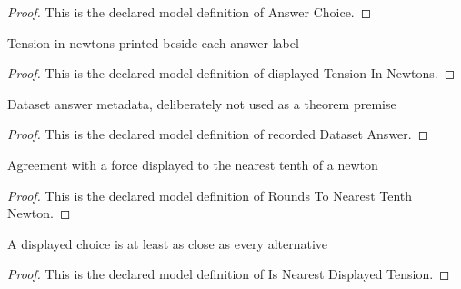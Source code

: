 \begin{proof}
  This is the declared model definition of Answer Choice.
\end{proof}
\begin{definition}
  \label{def:physics:phyx-mini-0722:phyxminiproblems-problemphyxmini0722-displayedtensioninnewtons}
  Tension in newtons printed beside each answer label
\end{definition}
\begin{proof}
  This is the declared model definition of displayed Tension In Newtons.
\end{proof}
\begin{definition}
  \label{def:physics:phyx-mini-0722:phyxminiproblems-problemphyxmini0722-recordeddatasetanswer}
  Dataset answer metadata, deliberately not used as a theorem premise
\end{definition}
\begin{proof}
  This is the declared model definition of recorded Dataset Answer.
\end{proof}
\begin{definition}
  \label{def:physics:phyx-mini-0722:phyxminiproblems-problemphyxmini0722-roundstonearesttenthnewton}
  Agreement with a force displayed to the nearest tenth of a newton
\end{definition}
\begin{proof}
  This is the declared model definition of Rounds To Nearest Tenth Newton.
\end{proof}
\begin{definition}
  \label{def:physics:phyx-mini-0722:phyxminiproblems-problemphyxmini0722-isnearestdisplayedtension}
  A displayed choice is at least as close as every alternative
\end{definition}
\begin{proof}
  This is the declared model definition of Is Nearest Displayed Tension.
\end{proof}
